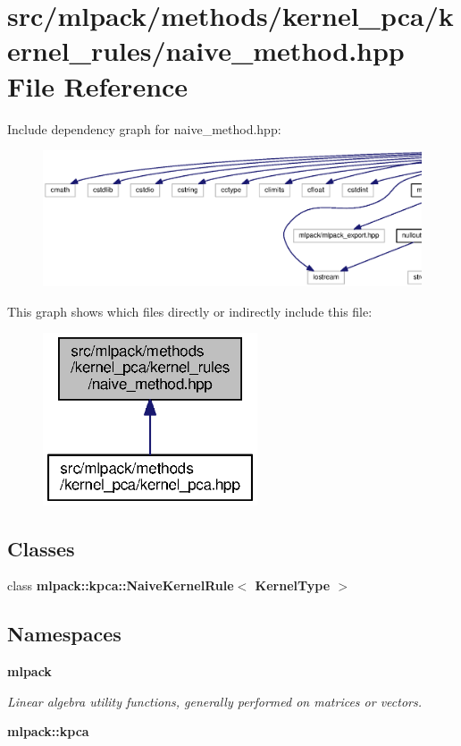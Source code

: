 \section{src/mlpack/methods/kernel\+\_\+pca/kernel\+\_\+rules/naive\+\_\+method.hpp File Reference}
\label{naive__method_8hpp}
Include dependency graph for naive\+\_\+method.\+hpp\+:
\nopagebreak
\begin{figure}[H]
\begin{center}
\leavevmode
\includegraphics[width=350pt]{naive__method_8hpp__incl}
\end{center}
\end{figure}
This graph shows which files directly or indirectly include this file\+:
\nopagebreak
\begin{figure}[H]
\begin{center}
\leavevmode
\includegraphics[width=180pt]{naive__method_8hpp__dep__incl}
\end{center}
\end{figure}
\subsection*{Classes}
\begin{DoxyCompactItemize}
\item 
class {\bf mlpack\+::kpca\+::\+Naive\+Kernel\+Rule$<$ Kernel\+Type $>$}
\end{DoxyCompactItemize}
\subsection*{Namespaces}
\begin{DoxyCompactItemize}
\item 
 {\bf mlpack}
\begin{DoxyCompactList}\small\item\em Linear algebra utility functions, generally performed on matrices or vectors. \end{DoxyCompactList}\item 
 {\bf mlpack\+::kpca}
\end{DoxyCompactItemize}


